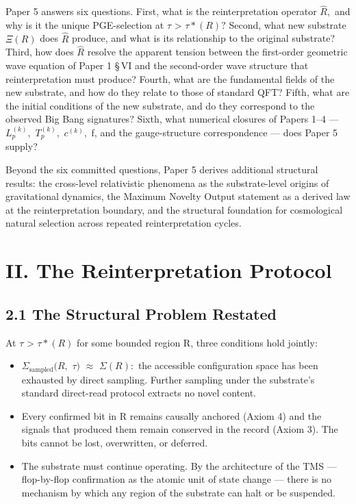 \documentclass[11pt,oneside]{report}
\theoremstyle{definition}
\theoremstyle{remark}
\begin{document}
Paper 5 answers six questions. First, what is the reinterpretation
operator \ensuremath{\hat{R},} and why is it the unique PGE-selection at \ensuremath{\tau} \textgreater{}
\ensuremath{\tau *(R)?} Second, what new substrate \ensuremath{\Xi (R)} does \ensuremath{\hat{R}} produce, and what is its
relationship to the original substrate? Third, how does \ensuremath{\hat{R}} resolve the
apparent tension between the first-order geometric wave equation of
Paper 1 \S\,VI and the second-order wave structure that reinterpretation
must produce? Fourth, what are the fundamental fields of the new
substrate, and how do they relate to those of standard QFT? Fifth, what
are the initial conditions of the new substrate, and do they correspond
to the observed Big Bang signatures? Sixth, what numerical closures of
Papers 1--4 --- \ensuremath{L_{p}^{(k)},} \ensuremath{T_{p}^{(k)},} \ensuremath{c^{(k)},} f, and the
gauge-structure correspondence --- does Paper 5 supply?

Beyond the six committed questions, Paper 5 derives additional
structural results: the cross-level relativistic phenomena as the
substrate-level origins of gravitational dynamics, the Maximum Novelty
Output statement as a derived law at the reinterpretation boundary, and
the structural foundation for cosmological natural selection across
repeated reinterpretation cycles.

\section*{II. The Reinterpretation Protocol}

\subsection*{2.1 The Structural Problem Restated}

At \ensuremath{\tau} \textgreater{} \ensuremath{\tau *(R)} for some bounded region R, three conditions
hold jointly:

\begin{itemize}
\item
  \ensuremath{\Sigma_{\mathrm{sampled}}(R,} \ensuremath{\tau )} \ensuremath{\approx} \ensuremath{\Sigma (R):} the accessible configuration space has been
  exhausted by direct sampling. Further sampling under the substrate's
  standard direct-read protocol extracts no novel content.
\item
  Every confirmed bit in R remains causally anchored (Axiom 4) and the
  signals that produced them remain conserved in the record (Axiom 3).
  The bits cannot be lost, overwritten, or deferred.
\item
  The substrate must continue operating. By the architecture of the TMS
  --- flop-by-flop confirmation as the atomic unit of state change ---
  there is no mechanism by which any region of the substrate can halt or
  be suspended.
\end{itemize}
\end{document}
